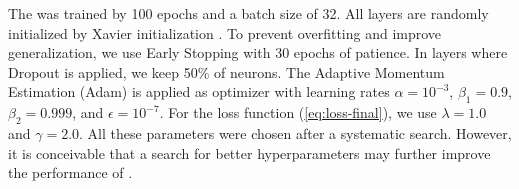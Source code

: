 The \methodname was trained by 100 epochs and a batch size of 32. All layers are randomly initialized by Xavier initialization \citep{glorot2010understanding}. To prevent overfitting and improve generalization, we use Early Stopping with 30 epochs of patience. In layers where Dropout is applied, we keep 50\% of neurons. The Adaptive Momentum Estimation (Adam) is applied as optimizer with learning rates $\alpha=10^{-3}$, $\beta_1=0.9$, $\beta_2=0.999$, and $\epsilon=10^{-7}$. For the loss function (\autoref{eq:loss-final}), we use $\lambda=1.0$ and $\gamma=2.0$. All these parameters were chosen after a systematic search. However, it is conceivable that a search for better hyperparameters may further improve the performance of \methodname.

